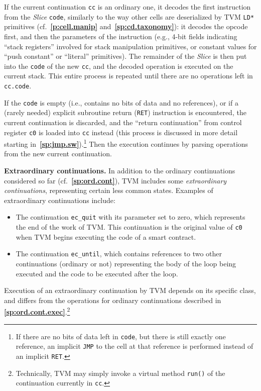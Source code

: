 \documentclass[12pt,oneside]{article}
\def\makepoint#1{\medbreak\noindent{\bf #1.\ }}
\def\nxsubpoint{\refstepcounter{subsubsection}%
  \smallbreak\makepoint{\thesubsubsection}}
\def\refpoint#1{{\rm\textbf{\ref{#1}}}}
\let\ptref=\refpoint
\def\emb#1{\textbf{#1.}}
\begin{document}
If the current continuation \texttt{cc} is an ordinary one, it decodes the first instruction from the {\em Slice\/} \texttt{code}, similarly to the way other cells are deserialized by TVM \texttt{LD*} primitives (cf.~\ptref{p:cell.manip} and~\ptref{sp:cd.taxonomy}): it decodes the opcode first, and then the parameters of the instruction (e.g., 4-bit fields indicating ``stack registers'' involved for stack manipulation primitives, or constant values for ``push constant'' or ``literal'' primitives). The remainder of the {\em Slice} is then put into the \texttt{code} of the new {\tt cc}, and the decoded operation is executed on the current stack. This entire process is repeated until there are no operations left in {\tt cc.code}.

If the {\tt code} is empty (i.e., contains no bits of data and no references), or if a (rarely needed) explicit subroutine return ({\tt RET}) instruction is encountered, the current continuation is discarded, and the ``return continuation'' from control register {\tt c0} is loaded into {\tt cc} instead (this process is discussed in more detail starting in~\ptref{sp:jmp.sw}).\footnote{If there are no bits of data left in {\tt code}, but there is still exactly one reference, an implicit {\tt JMP} to the cell at that reference is performed instead of an implicit {\tt RET}.} Then the execution continues by parsing operations from the new current continuation.

\nxsubpoint\label{sp:extraord.cont}\emb{Extraordinary continuations}
In addition to the ordinary continuations considered so far (cf.~\ptref{sp:ord.cont}), TVM includes some {\em extraordinary continuations}, representing certain less common states. Examples of extraordinary continuations include:

\begin{itemize}
\item The continuation {\tt ec\_quit} with its parameter set to zero, which represents the end of the work of TVM. This continuation is the original value of {\tt c0} when TVM begins executing the code of a smart contract.
\item The continuation {\tt ec\_until}, which contains references to two other continuations (ordinary or not) representing the body of the loop being executed and the code to be executed after the loop.
\end{itemize}
Execution of an extraordinary continuation by TVM depends on its specific class, and differs from the operations for ordinary continuations described in \ptref{sp:ord.cont.exec}.\footnote{Technically, TVM may simply invoke a virtual method \texttt{run()} of the continuation currently in {\tt cc}.}
\end{document}
